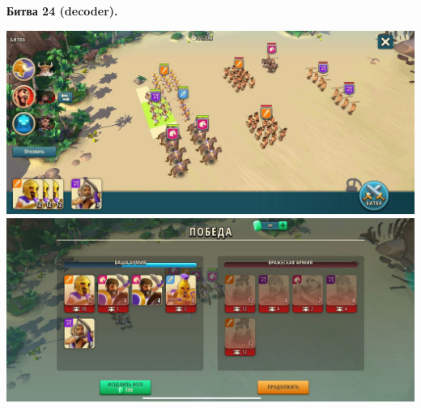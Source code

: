 \newpage
\begin{center}
	\hypertarget{fight24}{\textbf{Битва 24 (decoder).}}
\end{center}
\noindent\includegraphics[width=\linewidth]{./parts/media/TreasureHunt/24/decoder/photo_2022-04-06_18-10-02.jpg} \newline
\noindent\includegraphics[width=\linewidth]{./parts/media/TreasureHunt/24/decoder/photo_2022-04-06_18-10-13.jpg} \newline

